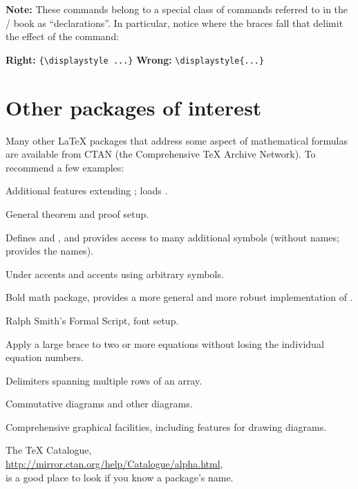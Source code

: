 \textbf{Note:} These commands belong to a special class of
commands referred to in the \lat/ book as ``declarations''. In
particular, notice where the braces fall that delimit the effect of the
command:
\begin{center}
\textbf{Right: } \verb'{\displaystyle ...}'
\qquad\qquad\textbf{Wrong: } \verb'\displaystyle{...}'
\end{center}


\section{Other packages of interest}
\label{other-packages}

Many other \LaTeX{} packages that address some aspect of mathematical
formulas are available from CTAN (the Comprehensive \TeX{} Archive
Network). To recommend a few examples:
\begin{description}
\raggedright
\item[mathtools] Additional features extending ; loads
  .
\item[amsthm] General theorem and proof setup.
\item[amsfonts] Defines  and , and provides access
  to many additional symbols (without names;  provides the
  names).
\item[accents] Under accents and accents using arbitrary symbols.
\item[bm] Bold math package, provides a more general and more robust
  implementation of .
\item[mathrsfs] Ralph Smith's Formal Script, font setup.
\item[cases] Apply a large brace to two or more equations without
  losing the individual equation numbers.
\item[delarray] Delimiters spanning multiple rows of an array.
\item[xypic] Commutative diagrams and other diagrams.
\item[TikZ] Comprehensive graphical facilities, including features for
  drawing diagrams.
\end{description}

The \TeX{} Catalogue,\\
\null\hspace{2\parindent}
\url{http://mirror.ctan.org/help/Catalogue/alpha.html},\\
is a good place to look if you know a package's name.

